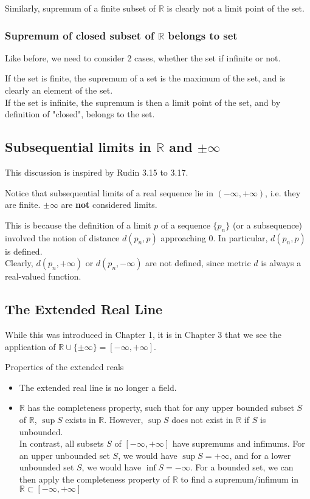\documentclass{article}
\begin{document}
Similarly, supremum of a finite subset of $\mathbb{R}$ is clearly not a limit point of the set.

\subsubsection{Supremum of closed subset of $\mathbb{R}$ belongs to set}
Like before, we need to consider 2 cases, whether the set if infinite or not.

If the set is finite, the supremum of a set is the maximum of the set, and is clearly an element of the set.\\
If the set is infinite, the supremum is then a limit point of the set, and by definition of "closed", belongs to the set.


\subsection{Subsequential limits in $\mathbb{R}$ and $\pm \infty$}
This discussion is inspired by Rudin 3.15 to 3.17.

Notice that subsequential limits of a real sequence lie in $(-\infty, +\infty)$, i.e. they are finite. $\pm \infty$ are \textbf{not} considered limits.

This is because the definition of a limit $p$ of a sequence $\{p_n\}$ (or a subsequence) involved the notion of distance $d(p_n, p)$ approaching 0. In particular, $d(p_n, p)$ is defined.\\
Clearly, $d(p_n, +\infty)$ or $d(p_n, -\infty)$ are not defined, since metric $d$ is always a real-valued function.

\subsection{The Extended Real Line}
While this was introduced in Chapter 1, it is in Chapter 3 that we see the application of $\mathbb{R} \cup \{\pm \infty\} = [-\infty, +\infty]$.

Properties of the extended reals
\begin{itemize}
	\item The extended real line is no longer a field.
	\item $\mathbb{R}$ has the completeness property, such that for any upper bounded subset $S$ of $\mathbb{R}$, $\sup S$ exists in $\mathbb{R}$. However, $\sup S$ does not exist in $\mathbb{R}$ if $S$ is unbounded.\\
	 In contrast, all subsets $S$ of $[-\infty, +\infty]$ have supremums and infimums. For an upper unbounded set $S$, we would have $\sup S = + \infty$, and for a lower unbounded set $S$, we would have $\inf S = -\infty$. For a bounded set, we can then apply the completeness property of $\mathbb{R}$ to find a supremum/infimum in $\mathbb{R}\subset [-\infty, +\infty]$
\end{itemize}
\end{document}

